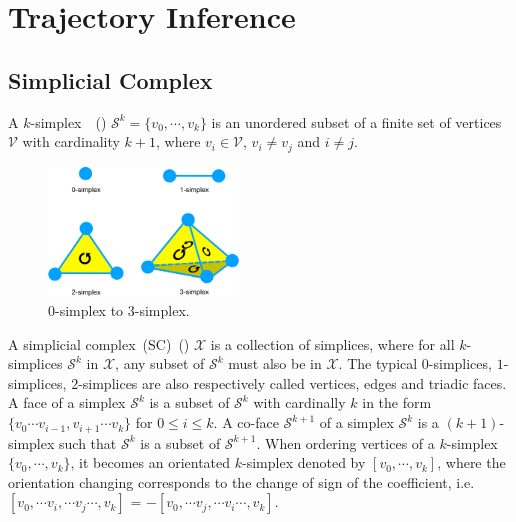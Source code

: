 \section{Trajectory Inference}
\label{TI_methods:TI}

\subsection{Simplicial Complex}



A $k$-simplex~\citep{schaub2021signal}~() $\mathcal{S}^k = \{{v}_0,\cdots,{v}_k \}$ is an unordered subset of a finite set of vertices $\mathcal{V}$ with cardinality $k + 1$, where $v_i\in \mathcal{V}$, $v_i \neq v_j$ and $i \neq j$.

\begin{figure}[!h]
    \centering
    \includegraphics[width=0.45\textwidth]{Simplex/fig}
    \vspace{0.1cm}
    \caption[0-simplex to 3-simplex.]{0-simplex to 3-simplex.}
    \label{fig:simplex}
\end{figure}

A simplicial complex~(SC)~() $\mathcal{X}$ is a collection of simplices, where for all $k$-simplices $\mathcal{S}^k$ in $\mathcal{X}$, any subset of $\mathcal{S}^k$ must also be in $\mathcal{X}$. The typical $0$-simplices, $1$-simplices, $2$-simplices are also respectively called vertices, edges and triadic faces. A face of a simplex $\mathcal{S}^k$ is a subset of $\mathcal{S}^k$  with cardinally $k$ in the form $\{v_0 \cdots v_{i-1}, v_{i+1}\cdots v_k\}$ for $0 \leq i \leq k$. A co-face $\mathcal{S}^{k+1}$ of a simplex $\mathcal{S}^k$ is a $(k + 1)$-simplex such that $\mathcal{S}^k$ is a subset of $\mathcal{S}^{k+1}$.  When ordering vertices of a $k$-simplex $\{{v}_0,\cdots,{v}_k \}$, it becomes an orientated $k$-simplex denoted by $[{v}_0,\cdots,{v}_k ]$, where the orientation changing corresponds to the change of sign of the coefficient, i.e. $[{v}_0,\cdots {v}_i, \cdots {v}_j\cdots,{v}_k ]$ = $-[{v}_0,\cdots {v}_j, \cdots {v}_i\cdots,{v}_k ]$.

